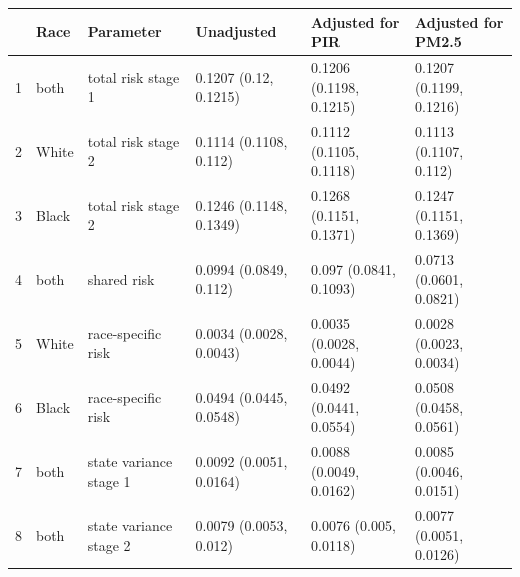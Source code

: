 \begin{table}[ht]
\centering
\begin{tabular}{rlllll}
  \hline
 & Race & Parameter & Unadjusted & Adjusted for PIR & Adjusted for PM2.5 \\ 
  \hline
1 & both & total risk stage 1 & 0.1207 (0.12, 0.1215) & 0.1206 (0.1198, 0.1215) & 0.1207 (0.1199, 0.1216) \\ 
  2 & White & total risk stage 2 & 0.1114 (0.1108, 0.112) & 0.1112 (0.1105, 0.1118) & 0.1113 (0.1107, 0.112) \\ 
  3 & Black & total risk stage 2 & 0.1246 (0.1148, 0.1349) & 0.1268 (0.1151, 0.1371) & 0.1247 (0.1151, 0.1369) \\ 
  4 & both & shared risk & 0.0994 (0.0849, 0.112) & 0.097 (0.0841, 0.1093) & 0.0713 (0.0601, 0.0821) \\ 
  5 & White & race-specific risk & 0.0034 (0.0028, 0.0043) & 0.0035 (0.0028, 0.0044) & 0.0028 (0.0023, 0.0034) \\ 
  6 & Black & race-specific risk & 0.0494 (0.0445, 0.0548) & 0.0492 (0.0441, 0.0554) & 0.0508 (0.0458, 0.0561) \\ 
  7 & both & state variance stage 1 & 0.0092 (0.0051, 0.0164) & 0.0088 (0.0049, 0.0162) & 0.0085 (0.0046, 0.0151) \\ 
  8 & both & state variance stage 2 & 0.0079 (0.0053, 0.012) & 0.0076 (0.005, 0.0118) & 0.0077 (0.0051, 0.0126) \\ 
   \hline
\end{tabular}
\end{table}
